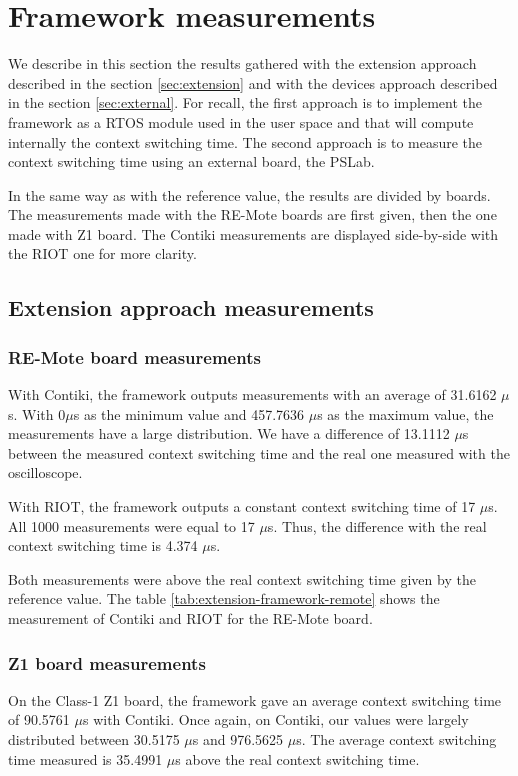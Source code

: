 \section{Framework measurements}

We describe in this section the results gathered with the extension approach described in the section \ref{sec:extension} and with the devices approach described in the section \ref{sec:external}.
For recall, the first approach is to implement the framework as a RTOS module used in the user space and that will compute internally the context switching time.
The second approach is to measure the context switching time using an external board, the PSLab.

In the same way as with the reference value, the results are divided by boards.
The measurements made with the RE-Mote boards are first given, then the one made with Z1 board.
The Contiki measurements are displayed side-by-side with the RIOT one for more clarity.

\subsection{Extension approach measurements}

\subsubsection{RE-Mote board measurements}
With Contiki, the framework outputs measurements with an average of 31.6162 $\mu$s.
With 0$\mu$s as the minimum value and 457.7636 $\mu$s as the maximum value, the measurements have a large distribution.
We have a difference of 13.1112 $\mu$s between the measured context switching time and the real one measured with the oscilloscope.

With RIOT, the framework outputs a constant context switching time of 17 $\mu$s.
All 1000 measurements were equal to 17 $\mu$s.
Thus, the difference with the real context switching time is 4.374 $\mu$s.

Both measurements were above the real context switching time given by the reference value.
The table \ref{tab:extension-framework-remote} shows the measurement of Contiki and RIOT for the RE-Mote board.



\subsubsection{Z1 board measurements}
On the Class-1 Z1 board, the framework gave an average context switching time of 90.5761 $\mu$s with Contiki.
Once again, on Contiki, our values were largely distributed between 30.5175 $\mu$s and 976.5625 $\mu$s.
The average context switching time measured is 35.4991 $\mu$s above the real context switching time.

